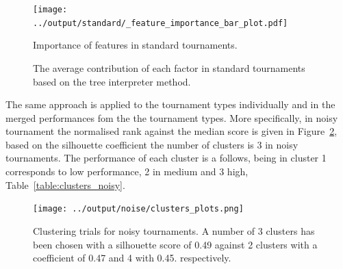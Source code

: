 \documentclass{article}
\begin{document}
\begin{figure}[!htbp]
    \begin{minipage}{.6\textwidth}
    \centering
    \texttt{[image: ../output/standard/\_feature\_importance\_bar\_plot.pdf]}
    \caption{Importance of features in standard tournaments.}
    \label{fig:importance_standard}
    \end{minipage}\hspace{.1cm}
    \begin{minipage}{.35\textwidth}
        \vspace{-1.5cm}
        \centering
        \resizebox{1.1\textwidth}{!}{
        }
        \caption{The average contribution of each factor in standard tournaments
        based on the tree interpreter method.}
    \end{minipage}
\end{figure}

The same approach is applied to the tournament types individually and in the
merged performances fom the the tournament types. More specifically, in noisy
tournament the normalised rank against the median score is given in
Figure~\ref{fig:noise_clusters}, based on the silhouette coefficient the number
of clusters is 3 in noisy tournaments. The performance of each cluster is
a follows, being in cluster 1 corresponds to low performance, 2 in medium
and 3 high, Table~\ref{table:clusters_noisy}.

\begin{figure}[!htbp]
    \centering
    \texttt{[image: ../output/noise/clusters\_plots.png]}
    \caption{Clustering trials for noisy tournaments. A number of 3
    clusters has been chosen with a silhouette score of 0.49 against 2 clusters
    with a coefficient of 0.47 and 4 with 0.45.
    respectively.}\label{fig:noise_clusters}
\end{figure}

\begin{table}[!htbp]
    \centering
    \caption{Median normalised rank and median score of each cluster in noisy tournaments.}
    \label{table:clusters_noisy}
\end{table}
\end{document}
